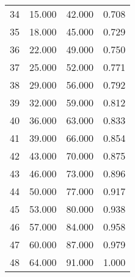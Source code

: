 \begin{tabular}{cccc}
  34 & 15.000 & 42.000 & 0.708 \\ 
  35 & 18.000 & 45.000 & 0.729 \\ 
  36 & 22.000 & 49.000 & 0.750 \\ 
  37 & 25.000 & 52.000 & 0.771 \\ 
  38 & 29.000 & 56.000 & 0.792 \\ 
  39 & 32.000 & 59.000 & 0.812 \\ 
  40 & 36.000 & 63.000 & 0.833 \\ 
  41 & 39.000 & 66.000 & 0.854 \\ 
  42 & 43.000 & 70.000 & 0.875 \\ 
  43 & 46.000 & 73.000 & 0.896 \\ 
  44 & 50.000 & 77.000 & 0.917 \\ 
  45 & 53.000 & 80.000 & 0.938 \\ 
  46 & 57.000 & 84.000 & 0.958 \\ 
  47 & 60.000 & 87.000 & 0.979 \\ 
  48 & 64.000 & 91.000 & 1.000 \\ 
   \hline
\end{tabular}
